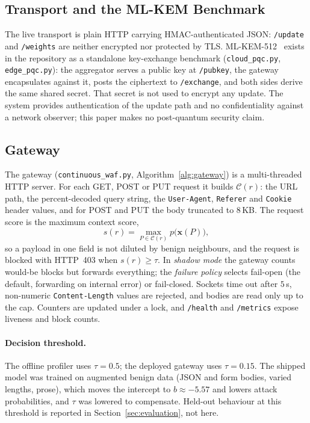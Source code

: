 \subsection{Transport and the ML-KEM Benchmark}
\label{sec:sys-pqc}
The live transport is plain HTTP carrying HMAC-authenticated JSON: \texttt{/update} and \texttt{/weights} are neither encrypted nor protected by TLS. ML-KEM-512~\cite{fips203} exists in the repository as a standalone key-exchange benchmark (\texttt{cloud\_pqc.py}, \texttt{edge\_pqc.py}): the aggregator serves a public key at \texttt{/pubkey}, the gateway encapsulates against it, posts the ciphertext to \texttt{/exchange}, and both sides derive the same shared secret. That secret is not used to encrypt any update. The system provides authentication of the update path and no confidentiality against a network observer; this paper makes no post-quantum security claim.

\subsection{Gateway}
\label{sec:sys-waf}
The gateway (\texttt{continuous\_waf.py}, Algorithm~\ref{alg:gateway}) is a multi-threaded HTTP server. For each GET, POST or PUT request it builds $\mathcal{C}(r)$: the URL path, the percent-decoded query string, the \texttt{User-Agent}, \texttt{Referer} and \texttt{Cookie} header values, and for POST and PUT the body truncated to $8$\,KB. The request score is the maximum context score,
\begin{equation}
s(r) = \max_{P\in\mathcal{C}(r)} p\big(\mathbf{x}(P)\big),
\end{equation}
so a payload in one field is not diluted by benign neighbours, and the request is blocked with HTTP~403 when $s(r)\ge\tau$. In \emph{shadow mode} the gateway counts would-be blocks but forwards everything; the \emph{failure policy} selects fail-open (the default, forwarding on internal error) or fail-closed. Sockets time out after $5$\,s, non-numeric \texttt{Content-Length} values are rejected, and bodies are read only up to the cap. Counters are updated under a lock, and \texttt{/health} and \texttt{/metrics} expose liveness and block counts.

\paragraph{Decision threshold.}
The offline profiler uses $\tau=0.5$; the deployed gateway uses $\tau=0.15$. The shipped model was trained on augmented benign data (JSON and form bodies, varied lengths, prose), which moves the intercept to $b\approx-5.57$ and lowers attack probabilities, and $\tau$ was lowered to compensate. Held-out behaviour at this threshold is reported in Section~\ref{sec:evaluation}, not here.

